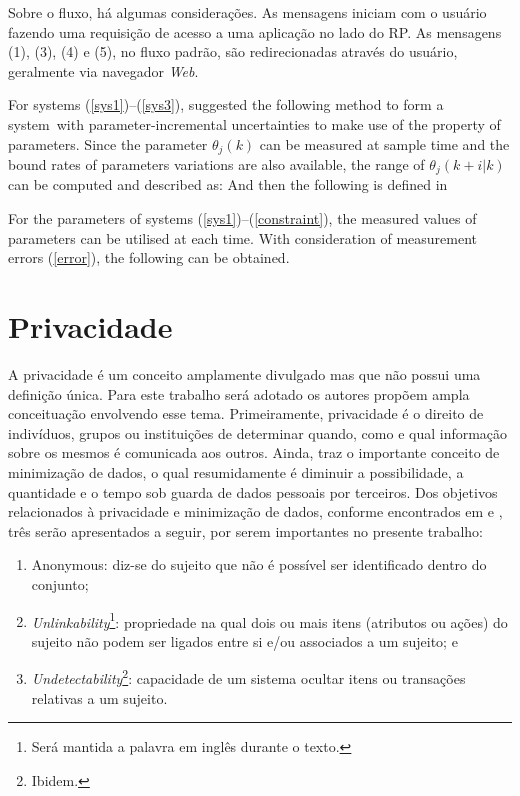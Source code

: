 \documentclass{doublecol-new}
\begin{document}
Sobre o fluxo, há algumas considerações. As mensagens iniciam com o usuário fazendo uma requisição de acesso a uma aplicação no lado do RP. As mensagens (1), (3), (4) e (5), no fluxo padrão, são redirecionadas através do usuário, geralmente via navegador \textit{Web}.

\noindent For systems (\ref{sys1})--(\ref{sys3}),
suggested the following method to form a system~with
parameter-incremental uncertainties to make use of the property of
parameters. Since the parameter $\theta _j (k)$ can be measured at
sample time and the bound rates of parameters variations are also
available, the range of $\theta_j(k + i|k)$ can be computed and
described as:
\noindent And then the following is defined in

For the parameters of systems (\ref{sys1})--(\ref{constraint}), the
measured values of parameters can be utilised at each time. With
consideration of measurement errors (\ref{error}), the following can
be obtained.

\section{Privacidade}

A privacidade é um conceito amplamente divulgado mas que não possui uma definição única. Para este trabalho será adotado os autores \cite{pfitzmann2010terminology} propõem ampla conceituação envolvendo esse tema. Primeiramente, privacidade é o direito de indivíduos, grupos ou instituições de determinar quando, como e qual informação sobre os mesmos é comunicada aos outros. Ainda, traz o importante conceito de minimização de dados, o qual resumidamente é diminuir a possibilidade, a quantidade e o tempo sob guarda de dados pessoais por terceiros. Dos objetivos relacionados à privacidade e minimização de dados, conforme encontrados em \cite{pfitzmann2010terminology} e \cite{deng2011privacy}, três serão apresentados a seguir, por serem importantes no presente trabalho:
\begin{enumerate}
	\item Anonymous: diz-se do sujeito que não é possível ser identificado dentro do conjunto;
	\item \textit{Unlinkability}\footnote{Será mantida a palavra em inglês durante o texto.}: propriedade na qual dois ou mais itens (atributos ou ações) do sujeito não podem ser ligados entre si e/ou associados a um sujeito; e
	\item \textit{Undetectability}\footnote{Ibidem.}: capacidade de um sistema ocultar itens ou transações relativas a um sujeito.
\end{enumerate}
\end{document}

